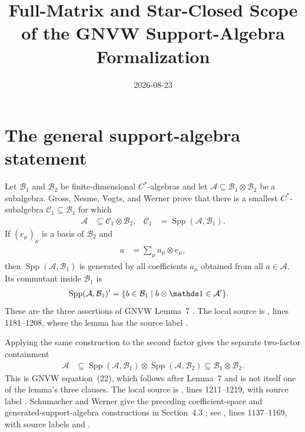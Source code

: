 \documentclass[11pt]{article}
\title{Full-Matrix and Star-Closed Scope of the GNVW Support-Algebra Formalization}
\author{}
\date{2026-08-23}
\begin{document}
\maketitle
{}

\section{The general support-algebra statement}

Let $\mathcal B_1$ and $\mathcal B_2$ be finite-dimensional $C^*$-algebras and
let $\mathcal A\subseteq\mathcal B_1\otimes\mathcal B_2$ be a subalgebra.
Gross, Nesme, Vogts, and Werner prove that there is a smallest $C^*$-subalgebra
$\mathcal C_1\subseteq\mathcal B_1$ for which
\begin{align}
    \mathcal A&\subseteq\mathcal C_1\otimes\mathcal B_2,
    &
    \mathcal C_1&=\operatorname{Spp}(\mathcal A,\mathcal B_1).
    \label{eq:gnvw_scope_least}
\end{align}
If $(e_\mu)_\mu$ is a basis of $\mathcal B_2$ and
\begin{align}
    a&=\sum_\mu a_\mu\otimes e_\mu,
\end{align}
then $\operatorname{Spp}(\mathcal A,\mathcal B_1)$ is generated by all
coefficients $a_\mu$ obtained from all $a\in\mathcal A$. Its commutant inside
$\mathcal B_1$ is
\begin{align}
    \operatorname{Spp}(\mathcal A,\mathcal B_1)'
    &=\{b\in\mathcal B_1\mid b\otimes\Id\in\mathcal A'\}.
    \label{eq:gnvw_scope_commutant}
\end{align}
These are the three assertions of GNVW Lemma~7
\cite[Section~7.1, Lemma~7]{Gross2012IndexTheory}.
The local source is
, lines 1181--1208, where the lemma has
the source label .

Applying the same construction to the second factor gives the separate
two-factor containment
\begin{align}
    \mathcal A
    &\subseteq
      \operatorname{Spp}(\mathcal A,\mathcal B_1)
      \otimes
      \operatorname{Spp}(\mathcal A,\mathcal B_2)
      \subseteq\mathcal B_1\otimes\mathcal B_2.
    \label{eq:gnvw_scope_two_factor}
\end{align}
This is GNVW equation~(22), which follows after Lemma~7 and is not itself one
of the lemma's three clauses.
The local source is
, lines 1211--1219, with source label
. Schumacher and Werner give the preceding coefficient-space and
generated-support-algebra constructions in Section~4.3
\cite{SchumacherWerner2004QCA}; see
, lines 1137--1169, with source labels
 and .
\end{document}
